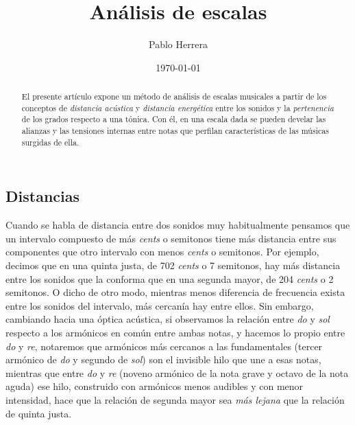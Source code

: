 \documentclass[a4paper,12pt]{article}
\begin{document}
\title{Análisis de escalas}
\author{Pablo Herrera}
\date{\today}
\maketitle
\begin{multicols}{2}
\begin{abstract}
El presente artículo expone un método de análisis de escalas musicales a partir de los conceptos de \emph{distancia acústica} y \emph{distancia energética} entre los sonidos y la \emph{pertenencia} de los grados respecto a una tónica. Con él, en una escala dada se pueden develar las alianzas y las tensiones internas entre notas que perfilan características de las músicas surgidas de ella.
\end{abstract}
\tableofcontents
\section{Distancias}\label{sec:distancias}

  Cuando se habla de distancia entre dos sonidos muy habitualmente pensamos que un intervalo compuesto de más \emph{cents} o semitonos tiene más distancia entre sus componentes que otro intervalo con menos \emph{cents} o semitonos. Por ejemplo, decimos que en una quinta justa, de 702 \emph{cents} o 7 semitonos, hay más distancia entre los sonidos que la conforma que en una segunda mayor, de 204 \emph{cents} o 2 semitonos. O dicho de otro modo, mientras menos diferencia de frecuencia exista entre los sonidos del intervalo, más cercanía hay entre ellos. Sin embargo, cambiando hacia una óptica acústica, si observamos la relación entre \emph{do} y \emph{sol} respecto a los armónicos en común entre ambas notas, y hacemos lo propio entre \emph{do} y \emph{re}, notaremos que armónicos más cercanos a las fundamentales (tercer armónico de \emph{do} y segundo de \emph{sol}) son el invisible hilo que une a esas notas, mientras que entre \emph{do} y \emph{re} (noveno armónico de la nota grave y octavo de la nota aguda) ese hilo, construido con armónicos menos audibles y con menor intensidad, hace que la relación de segunda mayor sea \emph{más lejana} que la relación de quinta justa.


\end{multicols}
\end{document}
